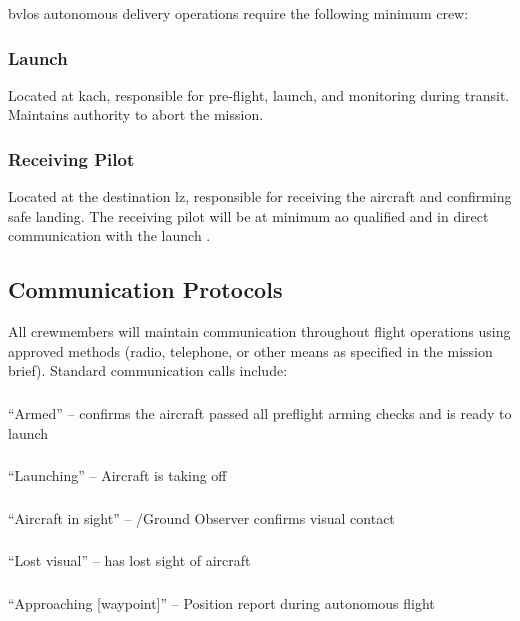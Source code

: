         \ac{bvlos} autonomous delivery operations require the following minimum crew:

            \subsubsection{Launch } Located at \ac{kach}, responsible for pre-flight, launch, and monitoring during transit. Maintains authority to abort the mission.

            \subsubsection{Receiving Pilot} Located at the destination \ac{lz}, responsible for receiving the aircraft and confirming safe landing. The receiving pilot will be at minimum \ac{ao} qualified and in direct communication with the launch .

    \subsection{Communication Protocols}\label{ssec:commprotocols}

        All crewmembers will maintain communication throughout flight operations using approved methods (radio, telephone, or other means as specified in the mission brief). Standard communication calls include:

        \subsubsection{} ``Armed'' --  confirms the aircraft passed all preflight arming checks and is ready to launch
        \subsubsection{} ``Launching'' -- Aircraft is taking off
        \subsubsection{} ``Aircraft in sight'' -- /Ground Observer confirms visual contact
        \subsubsection{} ``Lost visual'' --  has lost sight of aircraft
        \subsubsection{} ``Approaching [waypoint]'' -- Position report during autonomous flight
